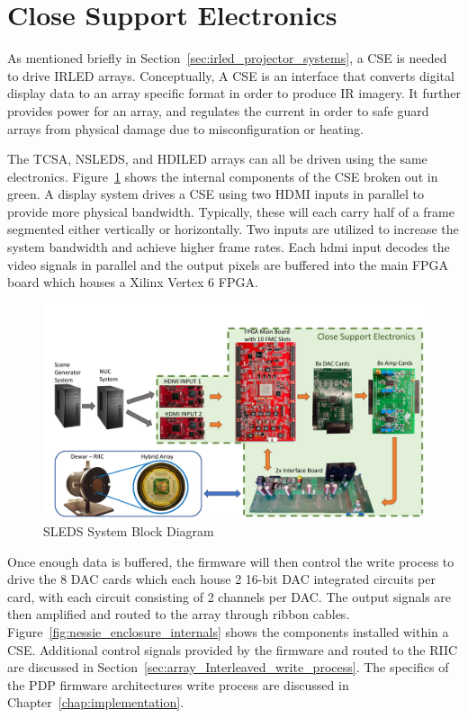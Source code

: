 \section{Close Support Electronics}
    \label{sec:close_support_electronics}
    As mentioned briefly in Section~\ref{sec:irled_projector_systems}, a CSE is needed to drive IRLED arrays. Conceptually, A CSE is an interface that converts digital display data to an array specific format in order to produce IR imagery. It further provides power for an array, and regulates the current in order to safe guard arrays from physical damage due to misconfiguration or heating.

    The TCSA, NSLEDS, and HDILED arrays can all be driven using the same electronics. Figure~\ref{fig:sleds_block} shows the internal components of the CSE broken out in green. A display system drives a CSE using two HDMI inputs in parallel to provide more physical bandwidth. Typically, these will each carry half of a frame segmented either vertically or horizontally. Two inputs are utilized to increase the system bandwidth and achieve higher frame rates. Each hdmi input decodes the video signals in parallel and the output pixels are buffered into the main FPGA board which houses a Xilinx Vertex 6 FPGA\cite{XILINX1}.

    \begin{figure}
        \centering
        \includegraphics[width=1.0\textwidth]{fig/sleds_block.pdf}
        \caption{SLEDS System Block Diagram}
        \label{fig:sleds_block}
    \end{figure}

    Once enough data is buffered, the firmware will then control the write process to drive the 8 DAC cards which each house 2 16-bit DAC integrated circuits per card, with each circuit consisting of 2 channels per DAC. The output signals are then amplified and routed to the array through ribbon cables. Figure~\ref{fig:nessie_enclosure_internals} shows the components installed within a CSE. Additional control signals provided by the firmware and routed to the RIIC are discussed in Section~\ref{sec:array_Interleaved_write_process}. The specifics of the PDP firmware architectures write process are discussed in Chapter~\ref{chap:implementation}.

